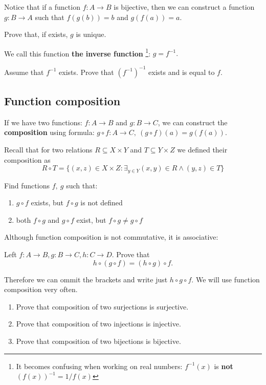 \noindent Notice that if a function $f: A\to B$ is bijective, then we can construct a function $g:B\to A$
such that $f(g(b))=b$ and $g(f(a))=a$.
\begin{prob}
	Prove that, if exists, $g$ is unique.
\end{prob}

\noindent We call this function \textbf{the inverse function}
\footnote{It becomes confusing when working on real numbers: $f^{-1}(x)$ is
\textbf{not} $(f(x))^{-1}=1/f(x)$}: $g=f^{-1}.$

\begin{prob}
	Assume that $f^{-1}$ exists. Prove that $(f^{-1})^{-1}$ exists and is equal to $f$.
\end{prob}

\subsection{Function composition}
If we have two functions: $f:A\to B$ and $g: B\to C$, we can construct the \textbf{composition} using formula:
$g\circ f: A\to C,~(g\circ f)(a) = g(f(a)).$

\begin{exercise}
  Recall that for two relations $R\subseteq X\times Y$ and $T\subseteq Y\times Z$ we defined their composition as $$R\circ T=\{(x,z)\in X\times Z : \exists_{y\in Y} (x,y)\in R \wedge (y,z)\in T\}$$
\end{exercise}

\begin{exercise}
	Find functions $f,~g$ such that:
	\begin{enumerate}
		\item $g\circ f$ exists, but $f\circ g$ is not defined
		\item both $f\circ g$ and $g\circ f$ exist, but $f\circ g\neq g\circ f$
	\end{enumerate}
\end{exercise}

Although function composition is not commutative, it is associative:
\begin{exercise}
	Left $f:A\to B, g: B\to C, h: C\to D$. Prove that
	$$h\circ (g\circ f) = (h\circ g)\circ f.$$
\end{exercise}
Therefore we can ommit the brackets and write just $h\circ g\circ f.$ We will use function composition very
often.

\begin{exercise}
    \begin{enumerate}
	   \item Prove that composition of two surjections is surjective.
	   \item Prove that composition of two injections is injective.
	   \item Prove that composition of two bijections is bijective.
    \end{enumerate}
\end{exercise}

